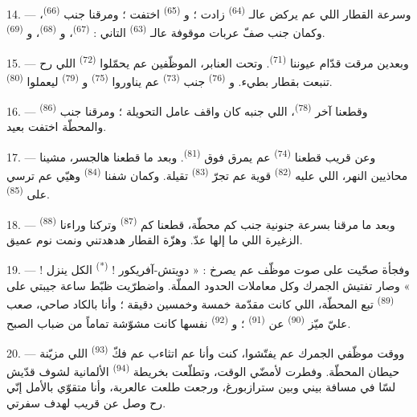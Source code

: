 14. --- وسرعة القطار اللي عم يركض عالـ
\textsuperscript{(64)} زادت ؛ و \textsuperscript{(65)}
اختفت ؛ ومرقنا جنب  \textsuperscript{(66)}، وكمان جنب
صفّ عربات موقوفة عالـ \textsuperscript{(63)} التاني :
 \textsuperscript{(67)}، و
\textsuperscript{(68)}، و \textsuperscript{(69)}.


15. --- وبعدين مرقت قدّام عيوننا 
\textsuperscript{(71)}. وتحت العنابر، الموظّفين عم يحمّلوا
 \textsuperscript{(72)} اللي رح تنبعت بقطار بطيء.
و \textsuperscript{(76)} جنب 
\textsuperscript{(73)} عم يناوروا 
\textsuperscript{(75)} و \textsuperscript{(79)}
ليعملوا  \textsuperscript{(80)}.

16. --- وقطعنا آخر  \textsuperscript{(78)}، اللي جنبه كان
واقف عامل التحويلة ؛ ومرقنا جنب 
\textsuperscript{(86)} والمحطّة اختفت بعيد.

17. --- وعن قريب قطعنا  \textsuperscript{(74)} عم يمرق
فوق  \textsuperscript{(81)}. وبعد ما قطعنا هالجسر، مشينا
محاذيين النهر، اللي عليه  \textsuperscript{(82)} قوية عم
تجرّ  \textsuperscript{(83)} تقيلة. وكمان شفنا  \textsuperscript{(84)} وهيّي عم ترسي على 
\textsuperscript{(85)}.

18. --- وبعد ما مرقنا بسرعة جنونية جنب كم محطّة، قطعنا كم
 \textsuperscript{(87)} وتركنا وراءنا 
\textsuperscript{(88)}  الزغيرة اللي ما إلها عدّ.
وهزّة القطار هدهدتني ونمت نوم عميق.

\VUsaut{3.0mm}
\VUsaut{3.0mm}

19. --- وفجأة صحّيت على صوت موظّف عم يصرخ : « دويتش-آفريكور !
\textsuperscript{(*)} الكل ينزل ! » وصار تفتيش الجمرك وكل معاملات
الحدود المملّة. واضطرّيت ظبّط ساعة جيبتي على 
\textsuperscript{(89)} تبع المحطّة، اللي كانت مقدّمة خمسة وخمسين دقيقة ؛
وأنا بالكاد صاحي، صعب عليّ ميّز 
\textsuperscript{(90)} عن  \textsuperscript{(91)} ؛
و \textsuperscript{(92)} نفسها كانت مشوّشة تماماً من
ضباب الصبح.

20. --- ووقت موظّفي الجمرك عم يفتّشوا، كنت وأنا عم اتثاءب عم فكّ
 \textsuperscript{(93)} اللي مزيّنة حيطان المحطّة.
وفطرت لأمضّي الوقت، وتطلّعت بخريطة  \textsuperscript{(94)}
الألمانية لشوف قدّيش لسّا في مسافة بيني وبين سترازبورغ، ورجعت طلعت
عالعربة، وأنا متقوّي بالأمل إنّي رح وصل عن قريب لهدف سفرتي.

\VUsaut{6.0mm}
\VUfilet{22mm}
